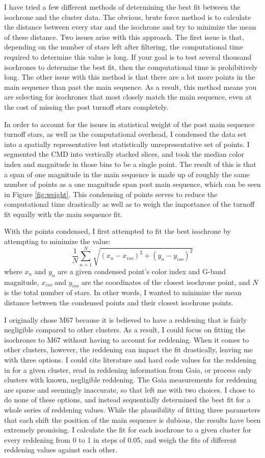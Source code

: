 \documentclass[aps,prb,twocolumn,groupedaddress,nofootinbib,floatfix]{revtex4-1}
\newcommand{\beq}{\begin{equation}}
\newcommand{\eeq}{\end{equation}}
\begin{document}
I have tried a few different methods of determining the best fit between the isochrone and the cluster data. The obvious, brute force method is to calculate the distance between every star and the isochrone and try to minimize the mean of these distance. Two issues arise with this approach. The first issue is that, depending on the number of stars left after filtering, the computational time required to determine this value is long. If your goal is to test several thousand isochrones to determine the best fit, then the computational time is prohibitively long. The other issue with this method is that there are a lot more points in the main sequence than past the main sequence. As a result, this method means you are selecting for isochrones that most closely match the main sequence, even at the cost of missing the post turnoff stars completely.

In order to account for the issues in statistical weight of the post main sequence turnoff stars, as well as the computational overhead, I condensed the data set into a spatially representative but statistically unrepresentative set of points. I segmented the CMD into vertically stacked slices, and took the median color index and magnitude in those bins to be a single point. The result of this is that a span of one magnitude in the main sequence is made up of roughly the same number of points as a one magnitude span post main sequence, which can be seen in Figure \ref{fig:weight}. This condensing of points serves to reduce the computational time drastically as well as to weigh the importance of the turnoff fit equally with the main sequence fit.

With the points condensed, I first attempted to fit the best isochrone by attempting to minimize the value:
\beq
\frac{1}{N}\sum\limits_{n=1}^{N}\sqrt{\left(x_n-x_{iso}\right)^2+\left(y_n-y_{iso}\right)^2}
\eeq
where $x_n$ and $y_n$ are a given condensed point's color index and G-band magnitude, $x_{iso}$ and $y_{iso}$ are the coordinates of the closest isochrone point, and $N$ is the total number of stars. In other words, I wanted to minimize the mean distance between the condensed points and their closest isochrone points.

I originally chose M67 because it is believed to have a reddening that is fairly negligible compared to other clusters. As a result, I could focus on fitting the isochrones to M67 without having to account for reddening. When it comes to other clusters, however, the reddening can impact the fit drastically, leaving me with three options. I could cite literature and hard code values for the reddening in for a given cluster, read in reddening information from Gaia, or process only clusters with known, negligible reddening. The Gaia measurements for reddening are sparse and seemingly inaccurate, so that left me with two choices. I chose to do none of these options, and instead sequentially determined the best fit for a whole series of reddening values. While the plausibility of fitting three parameters that each shift the position of the main sequence is dubious, the results have been extremely promising. I calculate the fit for each isochrone to a given cluster for every reddening from 0 to 1 in steps of 0.05, and weigh the fits of different reddening values against each other.
\end{document}
